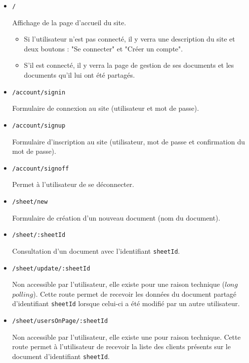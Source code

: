 \documentclass[11pt, letterpaper]{article}
\begin{document}
\begin{itemize}
    \item \verb+/+
    
    Affichage de la page d’accueil du site.
    \begin{itemize}
        \item Si l’utilisateur n’est pas connecté, il y verra une description du site et deux boutons : "Se connecter" et "Créer un compte". 
        \item  S'il est connecté, il y verra la page de gestion de ses documents et les documents qu’il lui ont été partagés.
    \end{itemize}

    \item \verb+/account/signin+
    
    Formulaire de connexion au site (utilisateur et mot de passe).
    
    \item \verb+/account/signup+
    
    Formulaire d’inscription au site (utilisateur, mot de passe et confirmation du mot de passe).

    \item \verb+/account/signoff+
    
    Permet à l’utilisateur de se déconnecter.

    \item \verb+/sheet/new+
    
    Formulaire de création d’un nouveau document (nom du document).

    \item \verb+/sheet/:sheetId+
    
    Consultation d’un document avec l’identifiant \verb+sheetId+.

    \item \verb+/sheet/update/:sheetId+

    Non accessible par l’utilisateur, elle existe pour une raison technique ($long$ $polling$). Cette route permet de recevoir les données du document partagé d’identifiant \verb+sheetId+ lorsque celui-ci a été modifié par un autre utilisateur.

    \item \verb+/sheet/usersOnPage/:sheetId+

    Non accessible par l’utilisateur, elle existe une pour raison technique. Cette route permet à l’utilisateur de recevoir la liste des clients présents sur le document d’identifiant \verb+sheetId+.
    
\end{itemize}
\end{document}

